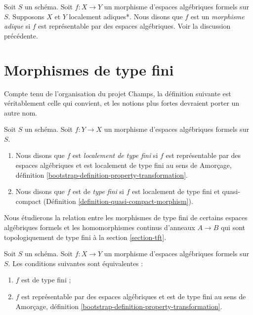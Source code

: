 \begin{definition}
\label{definition-adic-morphism}
Soit $S$ un schéma. Soit $f : X \to Y$ un morphisme d'espaces algébriques formels
sur $S$. Supposons $X$ et $Y$ localement adiques*. Nous disons que $f$ est
un {\it morphisme adique} si $f$ est représentable par des espaces algébriques.
Voir la discussion précédente.
\end{definition}











\section{Morphismes de type fini}
\label{section-finite-type}

\noindent
Compte tenu de l'organisation du projet Champs, la définition suivante
est véritablement celle qui convient, et les notions plus fortes devraient
porter un autre nom.

\begin{definition}
\label{definition-finite-type}
Soit $S$ un schéma. Soit $f : Y \to X$ un morphisme d'espaces algébriques formels
sur $S$.
\begin{enumerate}
\item Nous disons que $f$ est {\it localement de type fini}
si $f$ est représentable par des espaces algébriques et est localement
de type fini au sens de
Amorçage, définition \ref{bootstrap-definition-property-transformation}.
\item Nous disons que $f$ est de {\it type fini} si $f$ est localement de type fini et
quasi-compact (Définition \ref{definition-quasi-compact-morphism}).
\end{enumerate}
\end{definition}

\noindent
Nous étudierons la relation entre les morphismes de type fini de
certains espaces algébriques formels et les
homomorphismes continus d'anneaux $A \to B$ qui sont topologiquement de type fini
à la section \ref{section-tft}.

\begin{lemma}
\label{lemma-characterize-finite-type}
Soit $S$ un schéma. Soit $f : X \to Y$ un morphisme d'espaces algébriques formels
sur $S$. Les conditions suivantes sont équivalentes :
\begin{enumerate}
\item $f$ est de type fini ;
\item $f$ est représentable par des espaces algébriques et est de type fini au
sens de
Amorçage, définition \ref{bootstrap-definition-property-transformation}.
\end{enumerate}
\end{lemma}

